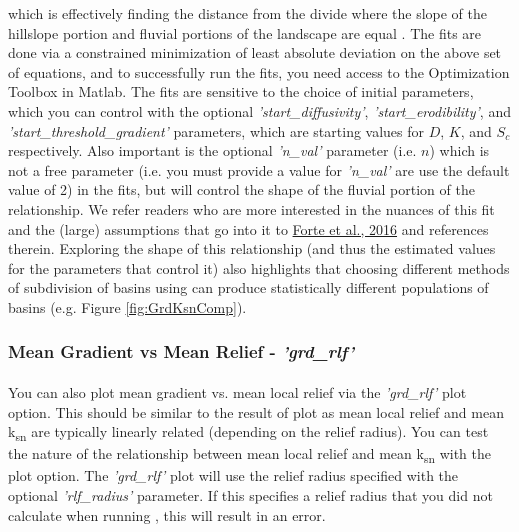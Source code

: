 \noindent which is effectively finding the distance from the divide where the slope of the hillslope portion and fluvial portions of the landscape are equal \citep[e.g.,][]{Howard1997,Perron2008}. The fits are done via a constrained minimization of least absolute deviation on the above set of equations, and to successfully run the fits, you need access to the Optimization Toolbox in Matlab. The fits are sensitive to the choice of initial parameters, which you can control with the optional \textit{'start\_diffusivity'}, \textit{'start\_erodibility'}, and \textit{'start\_threshold\_gradient'} parameters, which are starting values for $D$, $K$, and $S_{c}$ respectively. Also important is the optional \textit{'n\_val'} parameter (i.e. $n$) which is not a free parameter  (i.e. you must provide a value for \textit{'n\_val'} are use the default value of 2) in the fits, but will control the shape of the fluvial portion of the relationship. We refer readers who are more interested in the nuances of this fit and the (large) assumptions that go into it to \href{https://www.sciencedirect.com/science/article/pii/S0012821X16303004}{Forte et al., 2016} and references therein. Exploring the shape of this relationship (and thus the estimated values for the parameters that control it) also highlights that choosing different methods of subdivision of basins using  can produce statistically different populations of basins (e.g. Figure \ref{fig:GrdKsnComp}). 



\subsubsection{Mean Gradient vs Mean Relief - \textit{'grd\_rlf'}} \label{sec:grdrlf}
\paragraph{}You can also plot mean gradient vs. mean local relief via the \textit{'grd\_rlf'} plot option. This should be similar to the result of  plot as mean local relief and mean k\textsubscript{sn} are typically linearly related (depending on the relief radius). You can test the nature of the relationship between mean local relief and mean k\textsubscript{sn} with the  plot option. The \textit{'grd\_rlf'} plot will use the relief radius specified with the optional \textit{'rlf\_radius'} parameter. If this specifies a relief radius that you did not calculate when running , this will result in an error.

